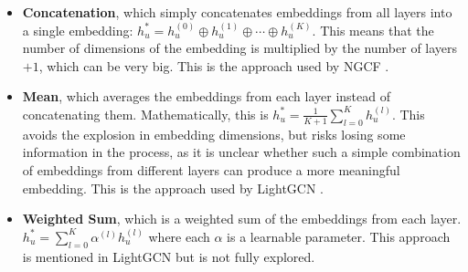 \documentclass{article}
\begin{document}
\begin{itemize}
    \item \textbf{Concatenation}, which simply concatenates embeddings from all layers into a single embedding:
    $h_u^*=h_u^{(0)} \oplus h_u^{(1)} \oplus \cdots \oplus h_u^{(K)}$.
    This means that the number of dimensions of the embedding is multiplied by the number of layers $+1$, which can be very big. This is the approach used by NGCF \cite{ngcf}.
    \item \textbf{Mean}, which averages the embeddings from each layer instead of concatenating them. Mathematically, this is
    $h_u^*=\frac{1}{K+1}\sum_{l=0}^Kh_u^{(l)}$.
    This avoids the explosion in embedding dimensions, but risks losing some information in the process, as it is unclear whether such a simple combination of embeddings from different layers can produce a more meaningful embedding. This is the approach used by LightGCN \cite{lightgcn}.
    \item \textbf{Weighted Sum}, which is a weighted sum of the embeddings from each layer.
    $h_u^*=\sum_{l=0}^K\alpha^{(l)}h_u^{(l)}$
    where each $\alpha$ is a learnable parameter. This approach is mentioned in LightGCN \cite{lightgcn} but is not fully explored.
    

\end{itemize}
\end{document}
